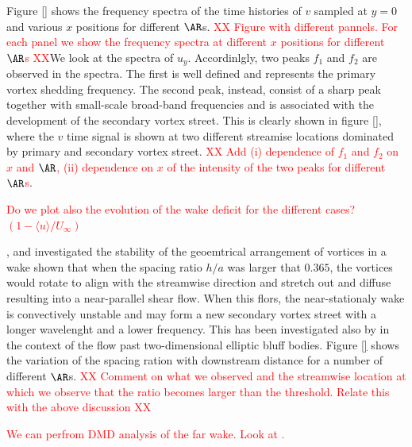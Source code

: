 Figure \ref{} shows the frequency spectra of the time histories of $v$ sampled at $y=0$ and various $x$ positions for different $\AR$s. \textcolor{red}{XX Figure with different pannels. For each panel we show the frequency spectra at different $x$ positions for different $\AR$s XX}We look at the spectra of $u_y$. Accordinlgly, two peaks $f_1$ and $f_2$ are observed in the spectra. The first is well defined and represents the primary vortex shedding frequency. The second peak, instead, consist of a sharp peak together with small-scale broad-band frequencies and is associated with the development of the secondary vortex street. This is clearly shown in figure \ref{}, where the $v$ time signal is shown at two different streamise locations dominated by primary and secondary vortex street. \textcolor{red}{XX Add (i) dependence of $f_1$ and $f_2$ on $x$ and $\AR$, (ii) dependence on $x$ of the intensity of the two peaks for different $\AR$s}.

\textcolor{red}{Do we plot also the evolution of the wake deficit for the different cases? $(1-\langle u \rangle/U_\infty)$}

\cite{durgin-karlsson-1971}, \cite{tsuboi-oshima-1985} and \cite{karasudani-funakoshi-1994} investigated the stability of the geoemtrical arrangement of vortices in a wake shown that when the spacing ratio $h/a$ was larger that $0.365$, the vortices would rotate to align with the streamwise direction and stretch out and diffuse resulting into a near-parallel shear flow. When this flors, the near-stationaly wake is convectively unstable and may form a new secondary vortex street with a longer wavelenght and a lower frequency. This has been investigated also by \cite{thompson-etal-2014} in the context of the flow past two-dimensional elliptic bluff bodies. Figure \ref{} shows the variation of the spacing ration with downstream distance for a number of different $\AR$s. \textcolor{red}{XX Comment on what we observed and the streamwise location at which we observe that the ratio becomes larger than the threshold. Relate this with the above discussion XX}


\textcolor{red}{We can perfrom DMD analysis of the far wake. Look at \cite{thompson-etal-2014}.}


\iffalse

